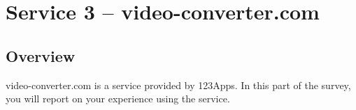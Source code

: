 \section{Service 3 – video-converter.com}
\subsection{Overview}
video-converter.com is a service provided by 123Apps. In this part of the survey, you will report on your experience using the service.


\clearpage

\clearpage

\clearpage
